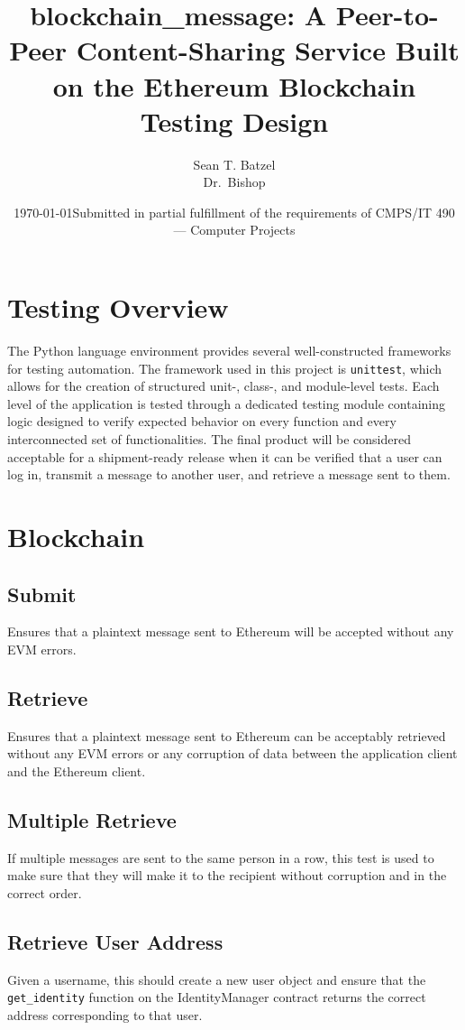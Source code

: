 \documentclass[titlepage]{report}
\title{blockchain\_message: A Peer-to-Peer Content-Sharing Service Built on the Ethereum Blockchain\\\large Testing Design}
\author{Sean T. Batzel\\Dr.\ Bishop}
\date{\today\endgraf\bigskip Submitted in partial fulfillment of the requirements of CMPS/IT 490 --- Computer Projects}
\begin{document}
\maketitle

\tableofcontents

\nocite{*}

\pagebreak

\section{Testing Overview}
The Python language environment provides several well-constructed frameworks for testing automation. The framework used in this project is \texttt{unittest}\cite{unittest}, which allows for the creation of structured unit-, class-, and module-level tests. Each level of the application is tested through a dedicated testing module containing logic designed to verify expected behavior on every function and every interconnected set of functionalities. The final product will be considered acceptable for a shipment-ready release when it can be verified that a user can log in, transmit a message to another user, and retrieve a message sent to them.

\section{Blockchain}
\subsection{Submit}
Ensures that a plaintext message sent to \gls{Ethereum} will be accepted without any EVM errors.
\subsection{Retrieve}
Ensures that a plaintext message sent to \gls{Ethereum} can be acceptably retrieved without any EVM errors or any corruption of data between the application client and the \gls{Ethereum} client.
\subsection{Multiple Retrieve}
If multiple messages are sent to the same person in a row, this test is used to make sure that they will make it to the recipient without corruption and in the correct order.
\subsection{Retrieve User Address}
Given a username, this should create a new user object and ensure that the \texttt{get\_identity} function on the IdentityManager contract returns the correct address corresponding to that user.
\end{document}
